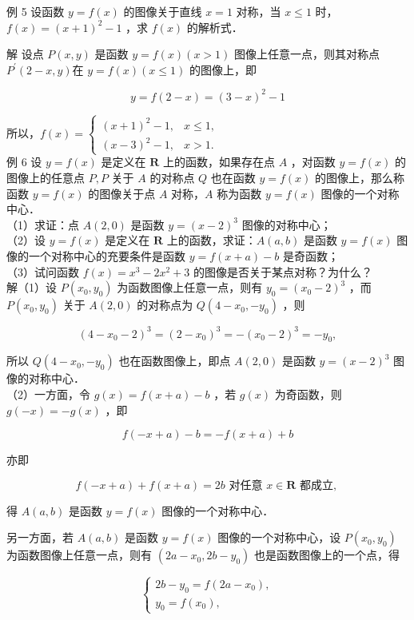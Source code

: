\documentclass[10pt]{article}
\begin{document}
例 5 设函数 \(y=f(x)\) 的图像关于直线 \(x=1\) 对称，当 \(x \leqslant 1\) 时，\(f(x)=(x+1)^{2}-1\) ，求 \(f(x)\) 的解析式．

解 设点 \(P(x, y)\) 是函数 \(y=f(x)(x>1)\) 图像上任意一点，则其对称点 \(P^{\prime}(2-x, y)\)在 \(y=f(x)(x \leqslant 1)\) 的图像上，即

\[
y=f(2-x)=(3-x)^{2}-1
\]

所以，\(f(x)= \begin{cases}(x+1)^{2}-1, & x \leqslant 1, \\ (x-3)^{2}-1, & x>1 .\end{cases}\)\\
例 6 设 \(y=f(x)\) 是定义在 \(\mathbf{R}\) 上的函数，如果存在点 \(A\) ，对函数 \(y=f(x)\) 的图像上的任意点 \(P, P\) 关于 \(A\) 的对称点 \(Q\) 也在函数 \(y=f(x)\) 的图像上，那么称函数 \(y=f(x)\) 的图像关于点 \(A\) 对称，\(A\) 称为函数 \(y=f(x)\) 图像的一个对称中心．\\
（1）求证：点 \(A(2,0)\) 是函数 \(y=(x-2)^{3}\) 图像的对称中心；\\
（2）设 \(y=f(x)\) 是定义在 \(\mathbf{R}\) 上的函数，求证：\(A(a, b)\) 是函数 \(y=f(x)\) 图像的一个对称中心的充要条件是函数 \(y=f(x+a)-b\) 是奇函数；\\
（3）试问函数 \(f(x)=x^{3}-2 x^{2}+3\) 的图像是否关于某点对称？为什么？\\
解（1）设 \(P\left(x_{0}, y_{0}\right)\) 为函数图像上任意一点，则有 \(y_{0}=\left(x_{0}-2\right)^{3}\) ，而 \(P\left(x_{0}, y_{0}\right)\) 关于 \(A(2,0)\) 的对称点为 \(Q\left(4-x_{0},-y_{0}\right)\) ，则

\[
\left(4-x_{0}-2\right)^{3}=\left(2-x_{0}\right)^{3}=-\left(x_{0}-2\right)^{3}=-y_{0},
\]

所以 \(Q\left(4-x_{0},-y_{0}\right)\) 也在函数图像上，即点 \(A(2,0)\) 是函数 \(y=(x-2)^{3}\) 图像的对称中心．\\
（2）一方面，令 \(g(x)=f(x+a)-b\) ，若 \(g(x)\) 为奇函数，则 \(g(-x)=-g(x)\) ，即

\[
f(-x+a)-b=-f(x+a)+b
\]

亦即

\[
f(-x+a)+f(x+a)=2 b \text { 对任意 } x \in \mathbf{R} \text { 都成立, }
\]

得 \(A(a, b)\) 是函数 \(y=f(x)\) 图像的一个对称中心．

另一方面，若 \(A(a, b)\) 是函数 \(y=f(x)\) 图像的一个对称中心，设 \(P\left(x_{0}, y_{0}\right)\) 为函数图像上任意一点，则有 \(\left(2 a-x_{0}, 2 b-y_{0}\right)\) 也是函数图像上的一个点，得

\[
\left\{\begin{array}{l}
2 b-y_{0}=f\left(2 a-x_{0}\right), \\
y_{0}=f\left(x_{0}\right),
\end{array}\right.
\]
\end{document}
